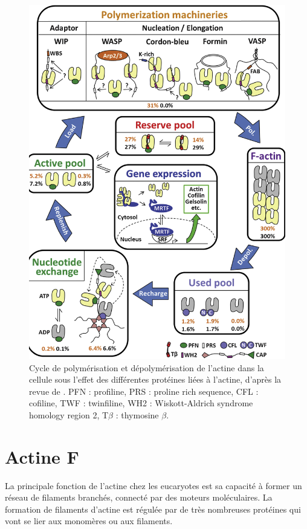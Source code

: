 \begin{figure}
\includegraphics[scale=0.25]{actine_cycle.png}
\caption{Cycle de polymérisation et dépolymérisation de l'actine dans la cellule sous l'effet des différentes protéines liées à l'actine, d'après la revue de \cite{xue_guardians_2013}. PFN : profiline, PRS : proline rich sequence, CFL : cofiline, TWF : twinfiline, WH2 : Wiskott-Aldrich syndrome homology region 2, T$\beta$ : thymosine $\beta$. } 
\end{figure}

\section{Actine F}

La principale fonction de l'actine chez les eucaryotes est sa capacité à former un réseau de filaments branchés, connecté par des moteurs moléculaires. 
La formation de filaments d'actine est régulée par de très nombreuses protéines qui vont se lier aux monomères ou aux filaments. 


